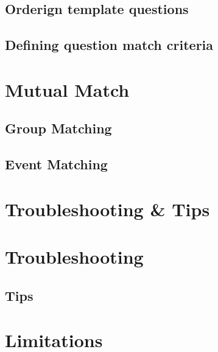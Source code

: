 \documentclass[a4paper,11pt,titlepage]{scrartcl}
\begin{document}
\subsection{Orderign template questions}

\subsection{Defining question match criteria}

\clearpage
\section{Mutual Match}

\subsection{Group Matching}

\subsection{Event Matching}


\section{Troubleshooting \& Tips}

\clearpage
\section{Troubleshooting}

\subsection{Tips}

\clearpage
\section{Limitations}
\end{document}
